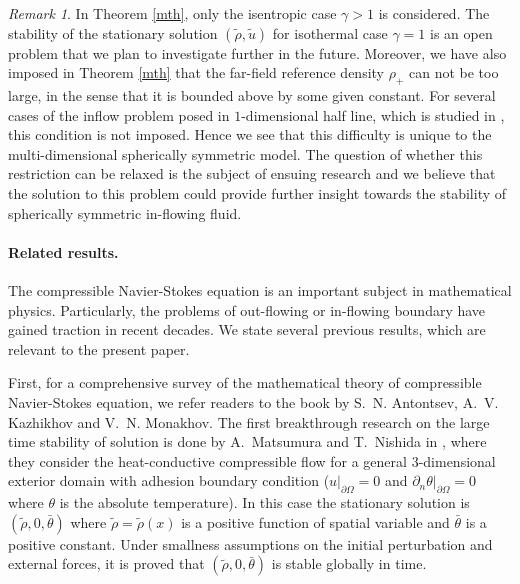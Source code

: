 \documentclass[a4paper,12pt,draft]{article}
\theoremstyle{remark}
\newtheorem{remark}[theorem]{Remark}
\def\d{\partial}
\def\ut{\tilde{u}}
\def\rt{\tilde{\rho}}
\begin{document}
\begin{remark}
In Theorem \ref{mth}, only the isentropic case $\gamma>1$ is considered. The stability of the stationary solution $(\rt,\ut)$ for isothermal case $\gamma=1$ is an open problem that we plan to investigate further in the future. Moreover, we have also imposed in Theorem \ref{mth} that the far-field reference density $\rho_{+}$ can not be too large, in the sense that it is bounded above by some given constant. For several cases of the inflow problem posed in $1$-dimensional half line, which is studied in \cite{m-n01}, this condition is not imposed. Hence we see that this difficulty is unique to the multi-dimensional spherically symmetric model. The question of whether this restriction can be relaxed is the subject of ensuing research and we believe that the solution to this problem could provide further insight towards the stability of spherically symmetric in-flowing fluid.    
\end{remark}


\paragraph{Related results.} The compressible Navier-Stokes equation is an important subject in mathematical physics. Particularly, the problems of out-flowing or in-flowing boundary have gained traction in recent decades. We state several previous results, which are relevant to the present paper.

First, for a comprehensive survey of the mathematical theory of compressible Navier-Stokes equation, we refer readers to the book \cite{kaz90} by S.~N. Antontsev, A.~V. Kazhikhov and V.~N. Monakhov. The first breakthrough research on the large time stability of solution is done by A.~Matsumura and T.~Nishida in \cite{m-n83}, where they consider the heat-conductive compressible flow for a general $3$-dimensional exterior domain with adhesion boundary condition ($u\vert_{\d\Omega}=0$ and $\d_{n}\theta\vert_{\d\Omega}=0$ where $\theta$ is the 
absolute 
temperature). In this case the stationary solution is $(\tilde{\rho},0,\bar{\theta})$ where $\tilde{\rho}=\tilde{\rho}(x)$ is a positive function of spatial variable and $\bar{\theta}$ is a positive constant. Under smallness assumptions on the initial perturbation and external forces, it is proved that $(\tilde{\rho},0,\bar{\theta})$ is stable globally in time.
\end{document}
